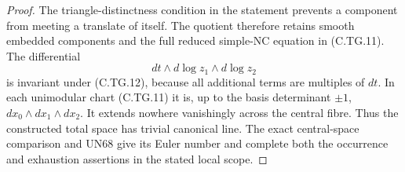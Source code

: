 \begin{proof}
The triangle-distinctness condition in
the statement prevents a component from
meeting a translate of itself. The
quotient therefore retains smooth embedded
components and the full reduced
simple-NC equation in (C.TG.11).
The differential
\[
                  dt\wedge d\log z_1\wedge d\log z_2
\tag{C.TG.15}
\]
is invariant under (C.TG.12), because all
additional terms are multiples of $dt$.
In each unimodular chart (C.TG.11) it is,
up to the basis determinant $\pm1$,
$dx_0\wedge dx_1\wedge dx_2$.
It extends nowhere vanishingly across
the central fibre. Thus the constructed
total space has trivial canonical line.
The exact central-space comparison and
UN68 give its Euler number and complete
both the occurrence and exhaustion
assertions in the stated local scope.
\end{proof}
